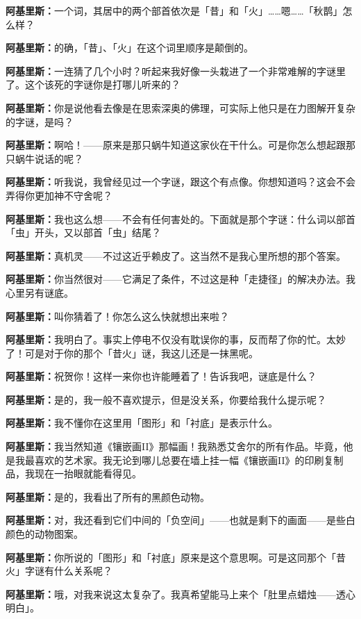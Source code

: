 \documentclass[
  12pt,
  twoside,
  openright,
  oldfontcommands,
]{memoir}
\newcommand{\dialogname}[1]{{\heifamily\bfseries #1}}
\begin{document}
\dialogname{阿基里斯：}一个词，其居中的两个部首依次是「昔」和「火」\ldots\ldots 嗯\ldots\ldots「秋鹊」怎么样？

\dialogname{阿基里斯：}的确，「昔」、「火」在这个词里顺序是颠倒的。

\dialogname{阿基里斯：}一连猜了几个小时？听起来我好像一头栽进了一个非常难解的字谜里了。这个该死的字谜你是打哪儿听来的？

\dialogname{阿基里斯：}你是说他看去像是在思索深奥的佛理，可实际上他只是在力图解开复杂的字谜，是吗？

\dialogname{阿基里斯：}啊哈！------原来是那只蜗牛知道这家伙在干什么。可是你怎么想起跟那只蜗牛说话的呢？

\dialogname{阿基里斯：}听我说，我曾经见过一个字谜，跟这个有点像。你想知道吗？这会不会弄得你更加神不守舍呢？

\dialogname{阿基里斯：}我也这么想------不会有任何害处的。下面就是那个字谜：什么词以部首「虫」开头，又以部首「虫」结尾？

\dialogname{阿基里斯：}真机灵------不过这近乎赖皮了。这当然不是我心里所想的那个答案。

\dialogname{阿基里斯：}你当然很对------它满足了条件，不过这是种「走捷径」的解决办法。我心里另有谜底。

\dialogname{阿基里斯：}叫你猜着了！你怎么这么快就想出来啦？

\dialogname{阿基里斯：}我明白了。事实上停电不仅没有耽误你的事，反而帮了你的忙。太妙了！可是对于你的那个「昔火」谜，我这儿还是一抹黑呢。

\dialogname{阿基里斯：}祝贺你！这样一来你也许能睡着了！告诉我吧，谜底是什么？

\dialogname{阿基里斯：}是的，我一般不喜欢提示，但是没关系，你要给我什么提示呢？

\dialogname{阿基里斯：}我不懂你在这里用「图形」和「衬底」是表示什么。

\dialogname{阿基里斯：}我当然知道《镶嵌画II》那幅画！我熟悉艾舍尔的所有作品。毕竟，他是我最喜欢的艺术家。我无论到哪儿总要在墙上挂一幅《镶嵌画II》的印刷复制品，我现在一抬眼就能看得见。

\dialogname{阿基里斯：}是的，我看出了所有的黑颜色动物。

\dialogname{阿基里斯：}对，我还看到它们中间的「负空间」------也就是剩下的画面------是些白颜色的动物图案。

\dialogname{阿基里斯：}你所说的「图形」和「衬底」原来是这个意思啊。可是这同那个「昔火」字谜有什么关系呢？

\dialogname{阿基里斯：}哦，对我来说这太复杂了。我真希望能马上来个「肚里点蜡烛------透心明白」。
\end{document}
